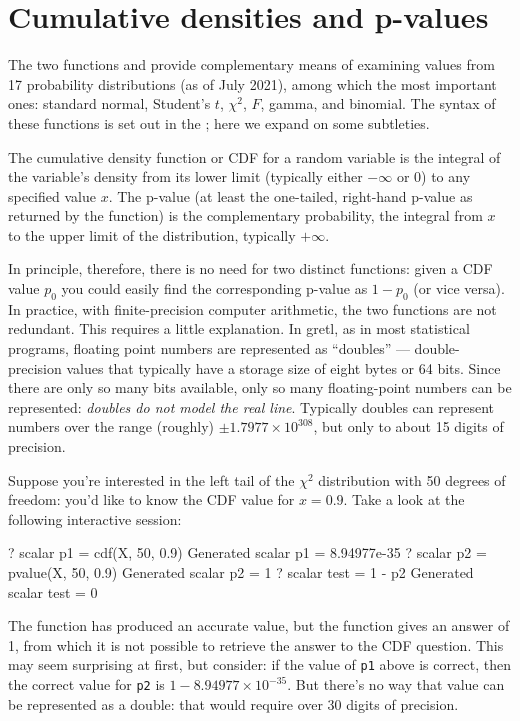 \section{Cumulative densities and p-values}
\label{sec:genr-cdf}

The two functions  and  provide complementary
means of examining values from 17 probability distributions (as of 
July 2021), among which the most important ones:
standard normal, Student's $t$, $\chi^2$, $F$, gamma, and binomial.
The syntax of these functions is set out in the \GCR; here we expand
on some subtleties.

The cumulative density function or CDF for a random variable
is the integral of the variable's density from its lower limit
(typically either $-\infty$ or 0) to any specified value $x$.  The
p-value (at least the one-tailed, right-hand p-value as returned by
the  function) is the complementary probability, the
integral from $x$ to the upper limit of the distribution, typically
$+\infty$.

In principle, therefore, there is no need for two distinct functions:
given a CDF value $p_0$ you could easily find the corresponding
p-value as $1-p_0$ (or vice versa).  In practice, with
finite-precision computer arithmetic, the two functions are not
redundant.  This requires a little explanation.  In gretl, as in
most statistical programs, floating point numbers are represented as
``doubles'' --- double-precision values that typically have a storage
size of eight bytes or 64 bits.  Since there are only so many bits
available, only so many floating-point numbers can be represented:
\textit{doubles do not model the real line}.  Typically doubles can
represent numbers over the range (roughly) $\pm 1.7977 \times
10^{308}$, but only to about 15 digits of precision.

Suppose you're interested in the left tail of the $\chi^2$ distribution
with 50 degrees of freedom: you'd like to know the CDF value for $x =
0.9$.  Take a look at the following interactive session:
\begin{code}
? scalar p1 = cdf(X, 50, 0.9)
Generated scalar p1 = 8.94977e-35
? scalar p2 = pvalue(X, 50, 0.9)
Generated scalar p2 = 1
? scalar test = 1 - p2
Generated scalar test = 0
\end{code}

The  function has produced an accurate value, but the
 function gives an answer of 1, from which it is not
possible to retrieve the answer to the CDF question.  This may seem
surprising at first, but consider: if the value of \texttt{p1} above
is correct, then the correct value for \texttt{p2} is $1 - 8.94977
\times 10^{-35}$.  But there's no way that value can be represented as
a double: that would require over 30 digits of precision.

